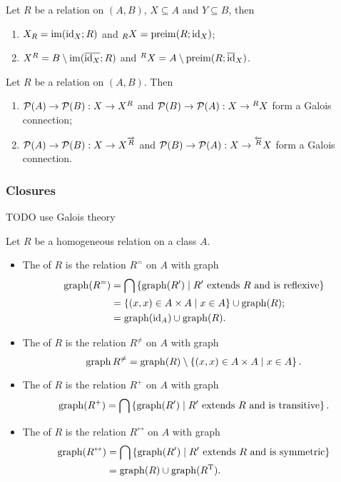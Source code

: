 \begin{lemma}
Let $R$ be a relation on $(A,B)$, $X\subseteq A$ and $Y\subseteq B$, then
\begin{enumerate}
\item $X_R = \operatorname{im}(\operatorname{id}_X; R)$ and $_RX = \operatorname{preim}(R;\operatorname{id}_X)$;
\item $X^R = B\setminus \operatorname{im}(\overline{\operatorname{id}_X}; R)$ and $^RX = A\setminus \operatorname{preim}(R;\overline{\operatorname{id}}_X)$.
\end{enumerate}
\end{lemma}

\begin{proposition}
Let $R$ be a relation on $(A,B)$. Then
\begin{enumerate}
\item $\operatorname{\mathcal{P}}(A)\to \operatorname{\mathcal{P}}(B): X\to X^R$ and $\operatorname{\mathcal{P}}(B)\to \operatorname{\mathcal{P}}(A): X\to {^RX}$ form a Galois connection;
\item $\operatorname{\mathcal{P}}(A)\to \operatorname{\mathcal{P}}(B): X\to X^{\overrightarrow{R}}$ and $\operatorname{\mathcal{P}}(B)\to \operatorname{\mathcal{P}}(A): X\to {^{\overleftarrow{R}}X}$ form a Galois connection.
\end{enumerate}
\end{proposition}

\subsubsection{Closures}
TODO use Galois theory
\begin{definition}
Let $R$ be a homogeneous relation on a class $A$.
\begin{itemize}
\item The  of $R$ is the relation $R^=$ on $A$ with graph
\begin{align*}
\operatorname{graph}(R^=) &= \bigcap\left\{ \operatorname{graph}(R') \;\middle|\; \text{$R'$ extends $R$ and is reflexive} \right\} \\
&= \left\{ (x,x)\in A\times A \;\middle|\; x\in A \right\}\cup \operatorname{graph}(R); \\
&= \operatorname{graph}(\operatorname{id}_A)\cup \operatorname{graph}(R).
\end{align*}
\item The  of $R$ is the relation $R^{\neq}$ on $A$ with graph
\[ \operatorname{graph}{R^{\neq}} = \operatorname{graph}(R)\setminus \left\{ (x,x)\in A\times A \;\middle|\; x \in A \right\}. \]
\item The  of $R$ is the relation $R^{+}$ on $A$ with graph
\[ \operatorname{graph}(R^+) = \bigcap\left\{ \operatorname{graph}(R') \;\middle|\; \text{$R'$ extends $R$ and is transitive} \right\}. \]
\item The  of $R$ is the relation $R^{\leftrightarrow}$ on $A$ with graph
\begin{align*}
\operatorname{graph}(R^\leftrightarrow) &= \bigcap\left\{ \operatorname{graph}(R') \;\middle|\; \text{$R'$ extends $R$ and is symmetric} \right\} \\
&=  \operatorname{graph}(R)\cup \operatorname{graph}(R^{\mathrm{T}}).
\end{align*}
\end{itemize}
\end{definition}

